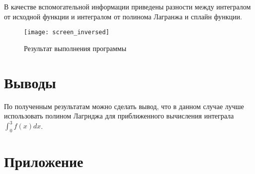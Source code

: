 В качестве вспомогательной информации приведены разности между интегралом от исходной функции и интегралом от полинома Лагранжа и сплайн функции.

\begin{figure}[H]
\begin{center}
	\texttt{[image: screen\_inversed]}
	\caption{Результат выполнения программы}
	\label{fig:res}
\end{center}
\end{figure}

\section{Выводы}

По полученным результатам можно сделать вывод, что в данном случае лучше использовать полином Лагрнджа для приближенного вычисления интеграла $\int_0^3 f(x)dx$.

\newpage

\section*{Приложение}


\parindent=1cm


